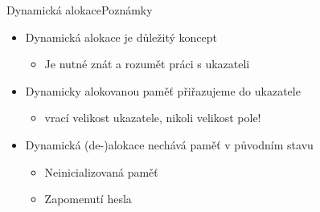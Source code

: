 \begin{frame}{Dynamická alokace}{Poznámky}

  \begin{itemize}
    \item Dynamická alokace je důležitý koncept
    \begin{itemize}
      \item Je nutné znát a rozumět práci s ukazateli
    \end{itemize}

    \pause

    \item Dynamicky alokovanou paměť přiřazujeme do ukazatele
    \begin{itemize}
      \item {} vrací velikost ukazatele, nikoli velikost
	pole!
    \end{itemize}

    \pause

    \item Dynamická (de-)alokace nechává paměť v původním stavu
    \begin{itemize}
      \item Neinicializovaná paměť
      \item Zapomenutí hesla
    \end{itemize}

  \end{itemize}

\end{frame}

